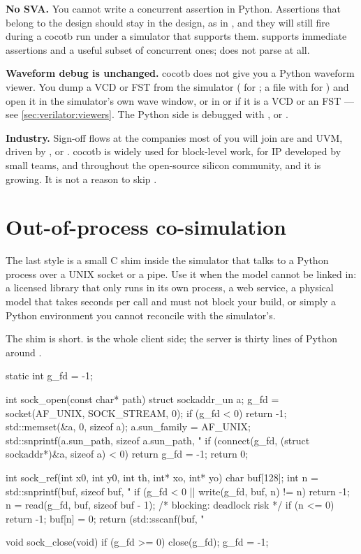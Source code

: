 \textbf{No SVA.} You cannot write a concurrent assertion in Python. Assertions
that belong to the design should stay in the design, as in
, and they will still fire during a cocotb run under a
simulator that supports them.  supports immediate assertions
and a useful subset of concurrent ones;  does not parse
 at all.

\textbf{Waveform debug is unchanged.} cocotb does not give you a Python
waveform viewer. You dump a VCD or FST from the simulator
( for ; a  file with
 for ) and open it in the simulator's own wave
window, or in  or  if it is a VCD or an FST ---
see \cref{sec:verilator:viewers}. The Python side is debugged with
,  or .

\textbf{Industry.} Sign-off flows at the companies most of you will join are
\SV{} and UVM, driven by ,  or . cocotb
is widely used for block-level work, for IP developed by small teams, and
throughout the open-source silicon community, and it is growing. It is not a
reason to skip .

\section{Out-of-process co-simulation}
\label{sec:python:socket}

The last style is a small C shim inside the simulator that talks to a Python
process over a UNIX socket or a pipe. Use it when the model cannot be linked
in: a licensed library that only runs in its own process, a web service, a
physical model that takes seconds per call and must not block your build, or
simply a Python environment you cannot reconcile with the simulator's.

The shim is short.  is the whole client side; the
server is thirty lines of Python around .

\begin{cppcode}[caption={A DPI shim over a UNIX socket
(\file{sock\_dpi.cpp}).},label={lst:python:sock}]
static int g_fd = -1;

int sock_open(const char* path) {
  struct sockaddr_un a;
  g_fd = socket(AF_UNIX, SOCK_STREAM, 0);
  if (g_fd < 0) return -1;
  std::memset(&a, 0, sizeof a);
  a.sun_family = AF_UNIX;
  std::snprintf(a.sun_path, sizeof a.sun_path, "%
  if (connect(g_fd, (struct sockaddr*)&a, sizeof a) < 0) return g_fd = -1;
  return 0;
}

int sock_ref(int x0, int y0, int th, int* xo, int* yo) {
  char buf[128];
  int n = std::snprintf(buf, sizeof buf, "%
  if (g_fd < 0 || write(g_fd, buf, n) != n) return -1;
  n = read(g_fd, buf, sizeof buf - 1);        /* blocking: deadlock risk */
  if (n <= 0) return -1;
  buf[n] = 0;
  return (std::sscanf(buf, "%
}

void sock_close(void) { if (g_fd >= 0) close(g_fd); g_fd = -1; }
\end{cppcode}

